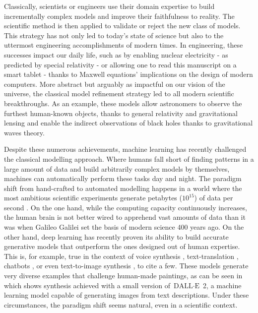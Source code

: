 Classically, scientists or engineers use their domain expertise to build incrementally complex models and improve their faithfulness to reality. The scientific method is then applied to validate or reject the new class of models. This strategy has not only led to today's state of science but also to the uttermost engineering accomplishments of modern times. In engineering, these successes impact our daily life, such as by enabling nuclear electricity - as predicted by special relativity - or allowing one to read this manuscript on a smart tablet - thanks to Maxwell equations' implications on the design of modern computers. More abstract but arguably as impactful on our vision of the universe, the classical model refinement strategy led to all modern scientific breakthroughs. As an example, these models allow astronomers to observe the furthest human-known objects, thanks to general relativity and gravitational lensing and enable the indirect observations of black holes thanks to gravitational waves theory.

Despite these numerous achievements, machine learning has recently challenged the classical modelling approach. Where humans fall short of finding patterns in a large amount of data and build arbitrarily complex models by themselves, machines can automatically perform these tasks day and night. The paradigm shift from hand-crafted to automated modelling happens in a world where the most ambitious scientific experiments generate petabytes ($10^{15}$) of data per second \citep{noauthor_cern_nodate}. On the one hand, while the computing capacity continuously increases, the human brain is not better wired to apprehend vast amounts of data than it was when Galileo Galilei set the basis of modern science 400 years ago. On the other hand, deep learning has recently proven its ability to build accurate generative models that outperform the ones designed out of human expertise. This is, for example, true in the context of voice synthesis \citep{van_den_oord_wavenet_2016}, text-translation \citep{brown2020language, devlin2018bert}, chatbots \citep{alayrac2022flamingo}, or even text-to-image synthesis \citep{ramesh2022hierarchical, saharia2022photorealistic}, to cite a few. These models generate very diverse examples that challenge human-made paintings, as can be seen in  which shows synthesis achieved with a small version of $\text{DALL}\cdot\text{E}$ 2, a machine learning model capable of generating images from text descriptions. Under these circumstances, the paradigm shift seems natural, even in a scientific context.


